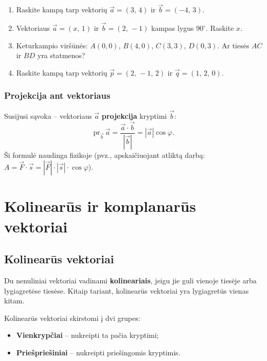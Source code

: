 \begin{exercise}
\begin{enumerate}[label=\arabic*.]
    \item Raskite kampą tarp vektorių $\vec{a} = (3,\, 4)$ ir $\vec{b} = (-4,\, 3)$.
    \item Vektoriaus $\vec{a} = (x,\, 1)$ ir $\vec{b} = (2,\, -1)$ kampas lygus $90^\circ$. Raskite $x$.
    \item Keturkampio viršūnės: $A(0,0)$, $B(4,0)$, $C(3,3)$, $D(0,3)$. Ar tiesės $AC$ ir $BD$ yra statmenos?
    \item Raskite kampą tarp vektorių $\vec{p} = (2,\, -1,\, 2)$ ir $\vec{q} = (1,\, 2,\, 0)$.
\end{enumerate}
\end{exercise}

\subsubsection*{Projekcija ant vektoriaus}

Susijusi sąvoka -- vektoriaus $\vec{a}$ \textbf{projekcija} kryptimi $\vec{b}$:
\[
\text{pr}_{\vec{b}}\, \vec{a} = \frac{\vec{a} \cdot \vec{b}}{|\vec{b}|} = |\vec{a}| \cos\varphi.
\]
Ši formulė naudinga fizikoje (pvz., apskaičiuojant atliktą darbą: $A = \vec{F} \cdot \vec{s} = |\vec{F}| \cdot |\vec{s}| \cdot \cos\varphi$).


\section{Kolinearūs ir komplanarūs vektoriai}

\subsection{Kolinearūs vektoriai}

\begin{definition}
Du nenuliniai vektoriai vadinami \textbf{kolineariais}, jeigu jie guli vienoje tiesėje arba lygiagretėse tiesėse. Kitaip tariant, kolinearūs vektoriai yra lygiagretūs vienas kitam.
\end{definition}

Kolinearūs vektoriai skirstomi į dvi grupes:
\begin{itemize}
    \item \textbf{Vienkrypčiai} – nukreipti ta pačia kryptimi;
    \item \textbf{Priešpriešiniai} – nukreipti priešingomis kryptimis.
\end{itemize}

